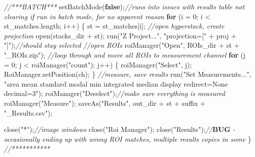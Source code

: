 \documentclass[
  12pt,
  a4paper,
]{book}
\newenvironment{Shaded}{}{}
\newcommand{\AlertTok}[1]{\textcolor[rgb]{1.00,0.00,0.00}{\textbf{#1}}}
\newcommand{\CommentTok}[1]{\textcolor[rgb]{0.38,0.63,0.69}{\textit{#1}}}
\newcommand{\ControlFlowTok}[1]{\textcolor[rgb]{0.00,0.44,0.13}{\textbf{#1}}}
\newcommand{\DecValTok}[1]{\textcolor[rgb]{0.25,0.63,0.44}{#1}}
\newcommand{\KeywordTok}[1]{\textcolor[rgb]{0.00,0.44,0.13}{\textbf{#1}}}
\newcommand{\NormalTok}[1]{#1}
\newcommand{\OperatorTok}[1]{\textcolor[rgb]{0.40,0.40,0.40}{#1}}
\newcommand{\StringTok}[1]{\textcolor[rgb]{0.25,0.44,0.63}{#1}}
\begin{document}
\begin{Shaded}
\begin{Highlighting}[]
\CommentTok{//***BATCH***}
\NormalTok{setBatchMode}\OperatorTok{(}\KeywordTok{false}\OperatorTok{);}\CommentTok{//runs into issues with results table not clearing if run in batch mode, for no apparent reason}
\ControlFlowTok{for} \OperatorTok{(}\NormalTok{i }\OperatorTok{=} \DecValTok{0}\OperatorTok{;}\NormalTok{ i }\OperatorTok{\textless{}}\NormalTok{ st\_matches}\OperatorTok{.}\NormalTok{length}\OperatorTok{;}\NormalTok{ i}\OperatorTok{++)} \OperatorTok{\{}
\NormalTok{    st }\OperatorTok{=}\NormalTok{ st\_matches}\OperatorTok{[}\NormalTok{i}\OperatorTok{];}
    \CommentTok{//open hyperstack, create projection}
\NormalTok{    open}\OperatorTok{(}\NormalTok{stacks\_dir }\OperatorTok{+}\NormalTok{ st}\OperatorTok{);}
\NormalTok{    run}\OperatorTok{(}\StringTok{"Z Project..."}\OperatorTok{,} \StringTok{"projection=["} \OperatorTok{+}\NormalTok{ proj }\OperatorTok{+} \StringTok{"]"}\OperatorTok{);}\CommentTok{//should stay selected}
    \CommentTok{//open ROIs}
\NormalTok{    roiManager}\OperatorTok{(}\StringTok{"Open"}\OperatorTok{,}\NormalTok{ ROIs\_dir }\OperatorTok{+}\NormalTok{ st }\OperatorTok{+} \StringTok{"\_ROIs.zip"}\OperatorTok{);}
    \CommentTok{//loop through and move all ROIs to measurement channel}
    \ControlFlowTok{for} \OperatorTok{(}\NormalTok{j }\OperatorTok{=} \DecValTok{0}\OperatorTok{;}\NormalTok{ j }\OperatorTok{\textless{}}\NormalTok{ roiManager}\OperatorTok{(}\StringTok{"count"}\OperatorTok{);}\NormalTok{ j}\OperatorTok{++)} \OperatorTok{\{}
\NormalTok{        roiManager}\OperatorTok{(}\StringTok{"Select"}\OperatorTok{,}\NormalTok{ j}\OperatorTok{);}
\NormalTok{        RoiManager}\OperatorTok{.}\NormalTok{setPosition}\OperatorTok{(}\NormalTok{ch}\OperatorTok{);}
    \OperatorTok{\}}
    \CommentTok{//measure, save results}
\NormalTok{    run}\OperatorTok{(}\StringTok{"Set Measurements..."}\OperatorTok{,} \StringTok{"area mean standard modal min integrated median display redirect=None decimal=3"}\OperatorTok{);}
\NormalTok{    roiManager}\OperatorTok{(}\StringTok{"Deselect"}\OperatorTok{);}\CommentTok{//make sure everything is measured}
\NormalTok{    roiManager}\OperatorTok{(}\StringTok{"Measure"}\OperatorTok{);}
\NormalTok{    saveAs}\OperatorTok{(}\StringTok{"Results"}\OperatorTok{,}\NormalTok{ out\_dir }\OperatorTok{+}\NormalTok{ st }\OperatorTok{+}\NormalTok{ suffix }\OperatorTok{+} \StringTok{"\_Results.csv"}\OperatorTok{);}
    
\NormalTok{    close}\OperatorTok{(}\StringTok{"*"}\OperatorTok{);}\CommentTok{//image windows}
\NormalTok{    close}\OperatorTok{(}\StringTok{"Roi Manager"}\OperatorTok{);}
\NormalTok{    close}\OperatorTok{(}\StringTok{"Results"}\OperatorTok{);}\CommentTok{//}\AlertTok{BUG}\CommentTok{ {-} occasionally ending up with wrong ROI matches, multiple results copies in some}
\OperatorTok{\}}
\CommentTok{//***********}
\end{Highlighting}
\end{Shaded}
\end{document}
